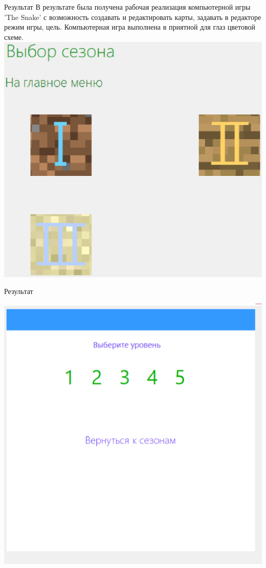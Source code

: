\documentclass[size=14pt,paper=screen,style=paintings]{powerdot}
\begin{document}

\begin{slide}{{\normalsize Результат}}
\vspace*{1cm}
В результате была получена рабочая реализация компьютерной игры 'The Snake' с возможность создавать и редактировать карты, задавать в редакторе режим игры, цель. Компьютерная игра выполнена в приятной для глаз цветовой схеме.
\includegraphics[scale=0.3]{img3.eps}

\end{slide}

\begin{slide}{{\normalsize Результат}}
\vspace*{1cm}
\begin{center}
\includegraphics[scale=0.3]{img4.eps}
\end{center}
\end{slide}
\end{document}
